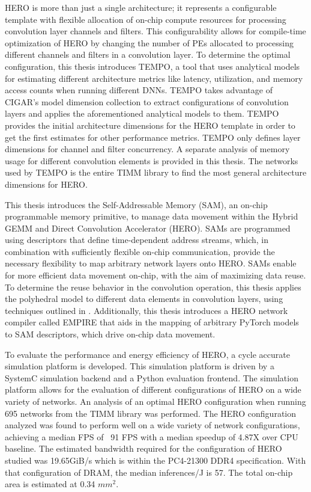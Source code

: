 HERO is more than just a single architecture; it represents a configurable
template with flexible allocation of on-chip compute resources for processing
convolution layer channels and filters. This configurability allows for
compile-time optimization of HERO by changing the number of PEs allocated to
processing different channels and filters in a convolution layer. To determine
the optimal configuration, this thesis introduces TEMPO, a tool that uses
analytical models for estimating different architecture metrics like latency,
utilization, and memory access counts when running different DNNs. TEMPO takes
advantage of CIGAR's model dimension collection to extract configurations of
convolution layers and applies the aforementioned analytical models to them.
TEMPO provides the initial architecture dimensions for the HERO template in
order to get the first estimates for other performance metrics. TEMPO only
defines layer dimensions for channel and filter concurrency. A separate analysis
of memory usage for different convolution elements is provided in this thesis.
The networks  used by TEMPO is the entire TIMM library to find the most general
architecture dimensions for HERO.


This thesis introduces the Self-Addressable Memory (SAM), an on-chip
programmable memory primitive, to manage data movement within the Hybrid GEMM
and Direct Convolution Accelerator (HERO). SAMs are programmed using descriptors
that define time-dependent address streams, which, in combination with
sufficiently flexible on-chip communication, provide the necessary flexibility
to map arbitrary network layers onto HERO. SAMs enable for more efficient data
movement on-chip, with the aim of maximizing data reuse. To determine the reuse
behavior in the convolution operation, this thesis applies the polyhedral model
to different data elements in convolution layers, using techniques outlined in
\cite{meeus}. Additionally, this thesis introduces a HERO network compiler
called EMPIRE that aids in the mapping of arbitrary PyTorch models to SAM
descriptors, which drive on-chip data movement.


To evaluate the performance and energy efficiency of HERO, a cycle accurate
simulation platform is developed. This simulation platform is driven by a
SystemC simulation backend and a Python evaluation frontend. The simulation
platform allows for the evaluation of different configurations of HERO on a wide
variety of networks. An analysis of an optimal HERO configuration when running
695 networks from the TIMM library was performed. The HERO configuration
analyzed was found to perform well on a wide variety of network configurations,
achieving a median FPS of ~91 FPS with a median speedup of 4.87X over CPU
baseline. The estimated bandwidth required for the configuration of HERO studied
was 19.65GiB/s which is within the PC4-21300 DDR4 specification. With that
configuration of DRAM, the median inferences/J is 57. The total on-chip area is
estimated at 0.34 $mm^2$.

